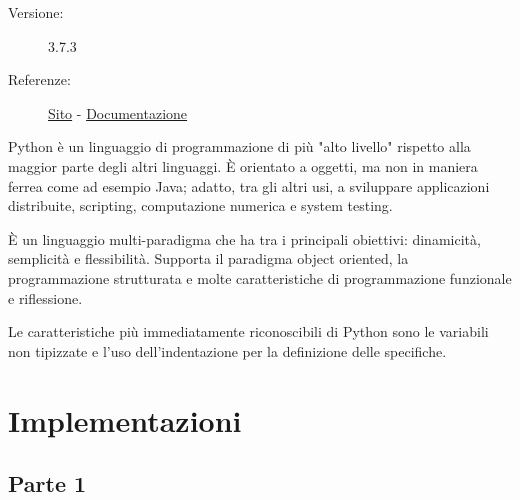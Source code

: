 \documentclass[preprint,12pt]{elsarticle}
\begin{document}
\medskip
\begin{description}
	\item[Versione:] 3.7.3
	\item[Referenze:] \href{https://www.python.org}{Sito} - \href{https://docs.python.org/3/}{Documentazione}
\end{description}

Python è un linguaggio di programmazione di più "alto livello" rispetto alla maggior parte degli altri linguaggi. È orientato a oggetti, ma non in maniera ferrea come ad esempio Java; adatto, tra gli altri usi, a sviluppare applicazioni distribuite, scripting, computazione numerica e system testing.

È un linguaggio multi-paradigma che ha tra i principali obiettivi: dinamicità, semplicità e flessibilità. Supporta il paradigma object oriented, la programmazione strutturata e molte caratteristiche di programmazione funzionale e riflessione.

Le caratteristiche più immediatamente riconoscibili di Python sono le variabili non tipizzate e l'uso dell'indentazione per la definizione delle specifiche. 

\newpage

\section{Implementazioni}
\subsection{Parte 1}

\begin{center}
\end{center}
\end{document}
